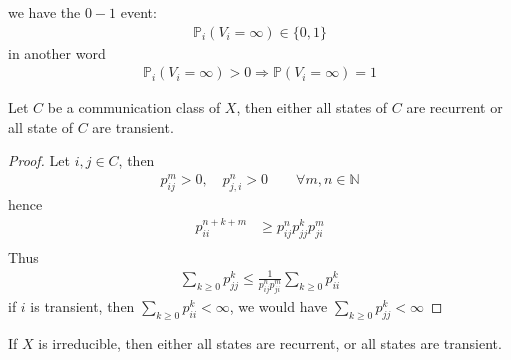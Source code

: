 \begin{remark}
we have the $0-1$ event:
\begin{align*}
	\mathbb{P}_i(V_i = \infty ) \in \{0, 1\}
\end{align*}	
in another word
\begin{align*}
	\mathbb{P}_i(V_i = \infty)> 0 \Rightarrow \mathbb{P}(V_i = \infty) = 1
\end{align*}
\end{remark}

\begin{corollary}
	Let $C$ be a communication class of $X$, then either all states of $C$ are recurrent or all state of $C$ are transient.
\end{corollary}
\begin{proof}
	Let $i, j \in C$, then
	\begin{align*}
		p_{ij}^m > 0, \quad p_{j, i}^n > 0 \qquad \forall m, n \in \mathbb{N}
	\end{align*}
	hence
	\begin{align*}
		p_{ii}^{n+k+m} &\geq p_{ij}^n p_{jj}^k p_{ji}^m\\
	\end{align*}
	Thus 
	\begin{align*}
		\sum_{k \geq 0} p_{jj}^k \le \frac{1}{p_{ij}^n p_{ji}^m} \sum_{k \geq
		 0} p_{ii}^k
	\end{align*}
	if $i$ is transient, then $\sum_{k \geq 0} p_{ii}^k < \infty$, we would have $\sum_{k \geq 0} p_{jj}^k < \infty$ 
\end{proof}
\begin{remark}
If $X$ is irreducible, then either all states are recurrent, or all states are transient.	
\end{remark}

